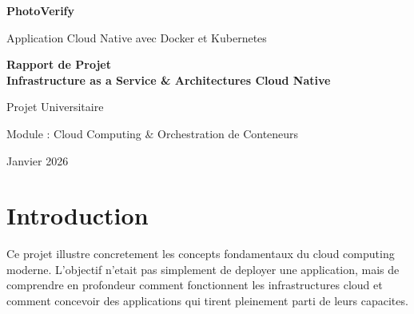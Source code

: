 \documentclass[12pt,a4paper]{article}
\begin{document}
\begin{titlepage}
    \centering
    \vspace*{2cm}
    
    {\Huge\bfseries\color{primaryblue} PhotoVerify\par}
    \vspace{0.5cm}
    {\Large\color{accentgray} Application Cloud Native avec Docker et Kubernetes\par}
    
    \vspace{2cm}
    
    \begin{tcolorbox}[colback=lightgray, colframe=primaryblue, width=0.8\textwidth, arc=3mm]
        \centering
        \large\bfseries Rapport de Projet\\[0.3cm]
        \normalsize Infrastructure as a Service \& Architectures Cloud Native
    \end{tcolorbox}
    
    \vspace{3cm}
    
    {\large Projet Universitaire\par}
    {\large Module : Cloud Computing \& Orchestration de Conteneurs\par}
    
    \vfill
    
    {\large Janvier 2026\par}
\end{titlepage}

\tableofcontents
\newpage

\section{Introduction}

Ce projet illustre concretement les concepts fondamentaux du cloud computing moderne. L'objectif n'etait pas simplement de deployer une application, mais de comprendre en profondeur comment fonctionnent les infrastructures cloud et comment concevoir des applications qui tirent pleinement parti de leurs capacites.
\end{document}
